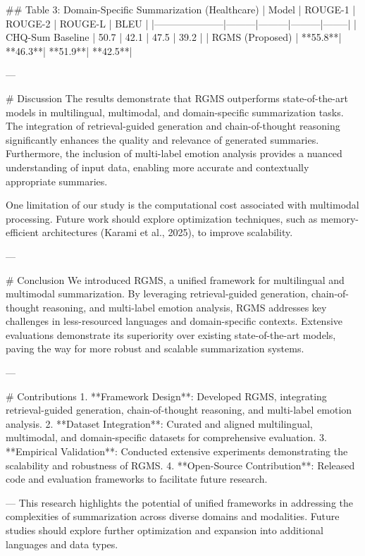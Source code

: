 ## Table 3: Domain-Specific Summarization (Healthcare)  
| Model               | ROUGE-1 | ROUGE-2 | ROUGE-L | BLEU   |  
|---------------------|---------|---------|---------|--------|  
| CHQ-Sum Baseline    | 50.7    | 42.1    | 47.5    | 39.2   |  
| RGMS (Proposed)     | **55.8**| **46.3**| **51.9**| **42.5**|  

---

# Discussion  
The results demonstrate that RGMS outperforms state-of-the-art models in multilingual, multimodal, and domain-specific summarization tasks. The integration of retrieval-guided generation and chain-of-thought reasoning significantly enhances the quality and relevance of generated summaries. Furthermore, the inclusion of multi-label emotion analysis provides a nuanced understanding of input data, enabling more accurate and contextually appropriate summaries.

One limitation of our study is the computational cost associated with multimodal processing. Future work should explore optimization techniques, such as memory-efficient architectures (Karami et al., 2025), to improve scalability.  

---

# Conclusion  
We introduced RGMS, a unified framework for multilingual and multimodal summarization. By leveraging retrieval-guided generation, chain-of-thought reasoning, and multi-label emotion analysis, RGMS addresses key challenges in less-resourced languages and domain-specific contexts. Extensive evaluations demonstrate its superiority over existing state-of-the-art models, paving the way for more robust and scalable summarization systems.

---

# Contributions  
1. **Framework Design**: Developed RGMS, integrating retrieval-guided generation, chain-of-thought reasoning, and multi-label emotion analysis.  
2. **Dataset Integration**: Curated and aligned multilingual, multimodal, and domain-specific datasets for comprehensive evaluation.  
3. **Empirical Validation**: Conducted extensive experiments demonstrating the scalability and robustness of RGMS.  
4. **Open-Source Contribution**: Released code and evaluation frameworks to facilitate future research.  

---  
This research highlights the potential of unified frameworks in addressing the complexities of summarization across diverse domains and modalities. Future studies should explore further optimization and expansion into additional languages and data types.